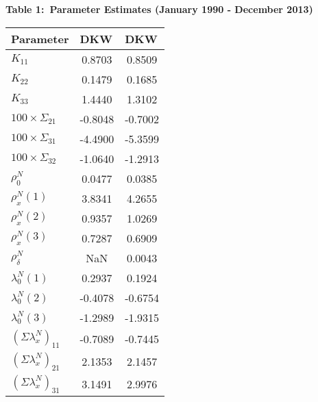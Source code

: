 \documentclass{article}
\begin{document}
\begin{center}
\textbf{Table 1:\ Parameter Estimates (January 1990 - December 2013)}{\tiny %
\ \bigskip }

\begin{tabular}{l|l|l}
\hline\hline
Parameter & DKW & DKW \\ \hline
$K_{11}$ & \multicolumn{1}{|c|}{0.8703} & \multicolumn{1}{|c}{0.8509} \\ 
$K_{22}$ & \multicolumn{1}{|c|}{0.1479} & \multicolumn{1}{|c}{0.1685} \\ 
$K_{33}$ & \multicolumn{1}{|c|}{1.4440} & \multicolumn{1}{|c}{1.3102} \\ 
$100\times \Sigma _{21}$ & \multicolumn{1}{|c|}{-0.8048} & 
\multicolumn{1}{|c}{-0.7002} \\ 
$100\times \Sigma _{31}$ & \multicolumn{1}{|c|}{-4.4900} & 
\multicolumn{1}{|c}{-5.3599} \\ 
$100\times \Sigma _{32}$ & \multicolumn{1}{|c|}{-1.0640} & 
\multicolumn{1}{|c}{-1.2913} \\ 
$\rho _{0}^{N}$ & \multicolumn{1}{|c|}{0.0477} & \multicolumn{1}{|c}{0.0385}
\\ 
$\rho _{x}^{N}\left( 1\right) $ & \multicolumn{1}{|c|}{3.8341} & 
\multicolumn{1}{|c}{4.2655} \\ 
$\rho _{x}^{N}\left( 2\right) $ & \multicolumn{1}{|c|}{0.9357} & 
\multicolumn{1}{|c}{1.0269} \\ 
$\rho _{x}^{N}\left( 3\right) $ & \multicolumn{1}{|c|}{0.7287} & 
\multicolumn{1}{|c}{0.6909} \\ 
$\rho _{\delta }^{N}$ & \multicolumn{1}{|c|}{NaN} & \multicolumn{1}{|c}{
0.0043} \\ 
$\lambda _{0}^{N}\left( 1\right) $ & \multicolumn{1}{|c|}{0.2937} & 
\multicolumn{1}{|c}{0.1924} \\ 
$\lambda _{0}^{N}\left( 2\right) $ & \multicolumn{1}{|c|}{-0.4078} & 
\multicolumn{1}{|c}{-0.6754} \\ 
$\lambda _{0}^{N}\left( 3\right) $ & \multicolumn{1}{|c|}{-1.2989} & 
\multicolumn{1}{|c}{-1.9315} \\ 
$\left( \Sigma \lambda _{x}^{N}\right) _{11}$ & \multicolumn{1}{|c|}{-0.7089}
& \multicolumn{1}{|c}{-0.7445} \\ 
$\left( \Sigma \lambda _{x}^{N}\right) _{21}$ & \multicolumn{1}{|c|}{2.1353}
& \multicolumn{1}{|c}{2.1457} \\ 
$\left( \Sigma \lambda _{x}^{N}\right) _{31}$ & \multicolumn{1}{|c|}{3.1491}
& \multicolumn{1}{|c}{2.9976} \\ 

\end{tabular}
\end{center}
\end{document}
